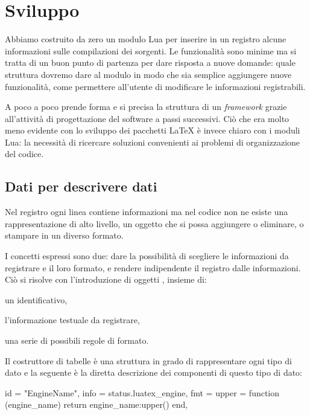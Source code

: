 \section{Sviluppo}

Abbiamo costruito da zero un modulo Lua per inserire in un registro alcune
informazioni sulle compilazioni dei sorgenti. Le funzionalità sono minime ma si
tratta di un buon punto di partenza per dare risposta a nuove domande: quale
struttura dovremo dare al modulo in modo che sia semplice aggiungere nuove
funzionalità, come permettere all'utente di modificare le informazioni
registrabili.

A poco a poco prende forma e si precisa la struttura di un \emph{framework}
grazie all'attività di progettazione del software a passi successivi. Ciò che
era molto meno evidente con lo sviluppo dei pacchetti \LaTeX{} è invece chiaro
con i moduli Lua: la necessità di ricercare soluzioni convenienti ai problemi di
organizzazione del codice.


\subsection{Dati per descrivere dati}


Nel registro ogni linea contiene informazioni ma nel codice non ne esiste una
rappresentazione di alto livello, un oggetto che si possa aggiungere o
eliminare, o stampare in un diverso formato.

I concetti espressi sono due: dare la possibilità di scegliere le informazioni
da registrare e il loro formato, e rendere indipendente il registro dalle
informazioni. Ciò si risolve con l'introduzione di oggetti , insieme
di:
\begin{compactitemize}
\item un identificativo,
\item l'informazione testuale da registrare,
\item una serie di possibili regole di formato.
\end{compactitemize}

Il costruttore di tabelle è una struttura in grado di rappresentare ogni tipo di
dato e la seguente è la diretta descrizione dei componenti di questo tipo di
dato:
\begin{lines}
{
    id = "EngineName",
    info = status.luatex_engine,
    fmt = {
        upper = function (engine_name)
            return engine_name:upper()
        end,
    }
}
\end{lines}

